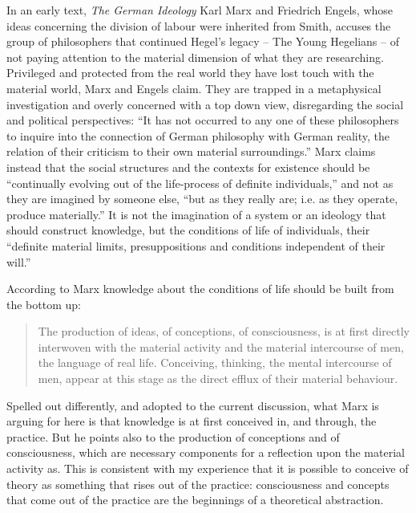 \documentclass[12pt]{article}
\begin{document}
In an early text, \emph{The German Ideology} Karl Marx and Friedrich Engels, whose ideas concerning the division of labour were inherited from Smith, accuses the group of philosophers that continued Hegel's legacy -- The Young Hegelians -- of not paying attention to the material dimension of what they are researching. Privileged and protected from the real world they have lost touch with the material world, Marx and Engels claim. They are trapped in a metaphysical investigation and overly concerned with a top down view, disregarding the social and political perspectives: ``It has not occurred to any one of these philosophers to inquire into the connection of German philosophy with German reality, the relation of their criticism to their own material surroundings.'' 
Marx claims instead that the social structures and the contexts for existence should be ``continually evolving out of the life-process of definite individuals,'' and not as they are imagined by someone else, ``but as they really are; i.e. as they operate, produce materially.'' It is not the imagination of a system or an ideology that should construct knowledge, but the conditions of life of individuals, their ``definite material limits, presuppositions and conditions independent of their will.''

According to Marx knowledge about the conditions of life should be built from the bottom up:

\begin{quote}
  The production of ideas, of conceptions, of consciousness, is at
  first directly interwoven with the material activity and the
  material intercourse of men, the language of real life. Conceiving,
  thinking, the mental intercourse of men, appear at this stage as the
  direct efflux of their material behaviour.
\end{quote}

Spelled out differently, and adopted to the current discussion, what Marx is arguing for here is that knowledge is at first conceived in, and through, the practice. But he points also to the production of conceptions and of consciousness, which are necessary components for a reflection upon the material activity as. This is consistent with my experience that it is possible to conceive of theory as something that rises out of the practice: consciousness and concepts that come out of the practice are the beginnings of a theoretical abstraction.
\end{document}
